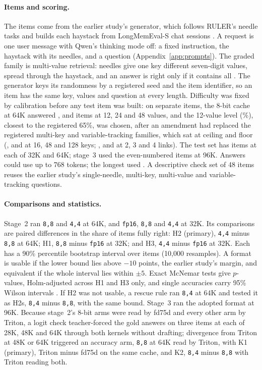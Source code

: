 \documentclass[11pt,letterpaper]{article}
\newcommand{\fmt}[1]{\texttt{#1}}
\begin{document}
\paragraph{Items and scoring.}
The items come from the earlier study's generator, which follows RULER's
needle tasks
\citep{hsieh2024ruler} and builds each haystack from LongMemEval-S chat
sessions \citep{wu2025longmemeval}. A request is one user message with Qwen's
thinking mode off: a fixed instruction, the haystack with its needles, and a
question (Appendix~\ref{app:prompts}). The graded family is multi-value
retrieval: \PeNeedles{} needles give one key different seven-digit values,
spread through the haystack, and an answer is right only if it contains all
\PeNeedles. The generator keys its randomness by a registered seed and the
item identifier, so an item has the same key, values and question at every
length. Difficulty was fixed by calibration before any test item was built: on
separate items, the 8-bit cache at 64K answered \PeCalMvTwelve,
\PeCalMvTwentyFour{} and \PeCalMvFortyEight{} items at 12, 24 and 48 values,
and the 12-value level (\PeCalMvAcc\%), closest to the registered 65\%, was
chosen, after an amendment had replaced the registered multi-key and
variable-tracking families, which sat at ceiling and floor
(\PeCalMkSixteen, \PeCalMkFortyEight{} and \PeCalMkOneTwentyEight{} at 16, 48
and 128 keys; \PeCalVtTwo, \PeCalVtThree{} and \PeCalVtFour{} at 2, 3 and 4
links). The test set has \PeHTwoN{} items at each of 32K and 64K; stage~3 used
the \PeArmEFNinetySixN{} even-numbered items at 96K. Answers could use up to 768
tokens; the longest used \PeAnswerMax. A descriptive check set of 48 items
reuses the earlier study's single-needle, multi-key, multi-value and
variable-tracking questions.

\paragraph{Comparisons and statistics.}
Stage~2 ran \fmt{8,8} and \fmt{4,4} at 64K, and \fmt{fp16}, \fmt{8,8} and
\fmt{4,4} at 32K. Its comparisons are paired differences in the share of
items fully right: H2 (primary), \fmt{4,4} minus \fmt{8,8} at 64K; H1,
\fmt{8,8} minus \fmt{fp16} at 32K; and H3, \fmt{4,4} minus \fmt{fp16} at 32K.
Each has a 90\% percentile bootstrap interval over items (10,000 resamples). A
format is usable if the lower bound lies above $-10$ points, the earlier
study's margin, and equivalent if the whole interval lies within $\pm5$.
Exact McNemar tests give $p$-values, Holm-adjusted across H1 and H3 only, and
single accuracies carry 95\% Wilson intervals \citep{wilson1927}. If H2 was
not usable, a rescue rule ran \fmt{8,4} at 64K and tested it as H2s,
\fmt{8,4} minus \fmt{8,8}, with the same bound. Stage~3 ran the adopted
format at 96K. Because stage~2's 8-bit arms were read by fd75d and every other
arm by Triton, a logit check teacher-forced the gold answers on three items at
each of 28K, 48K and 64K through both kernels without drafting; divergence
from Triton at 48K or 64K triggered an accuracy arm, \fmt{8,8} at 64K read by
Triton, with K1 (primary), Triton minus fd75d on the same cache, and K2,
\fmt{8,4} minus \fmt{8,8} with Triton reading both.
\end{document}
